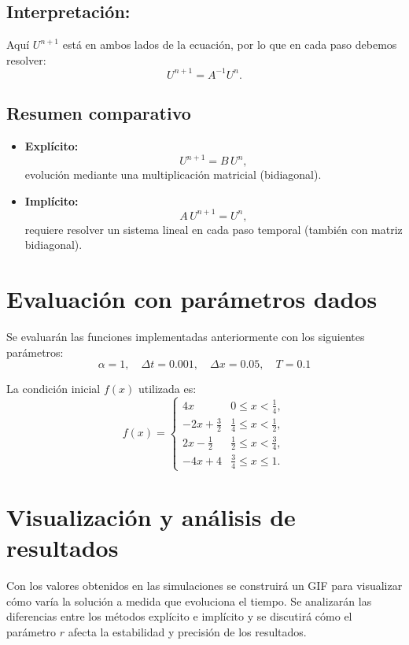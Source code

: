 \documentclass[12pt,a4paper]{article}
\begin{document}
\subsection*{Interpretación:}
Aquí $U^{n+1}$ está en ambos lados de la ecuación, por lo que en cada paso debemos resolver:
\[
U^{n+1} = A^{-1} U^n.
\]

\subsection{Resumen comparativo}

\begin{itemize}
    \item \textbf{Explícito:}  
    \[
    U^{n+1} = B\,U^n,
    \]
    evolución mediante una multiplicación matricial (bidiagonal).

    \item \textbf{Implícito:}  
    \[
    A\,U^{n+1} = U^n,
    \]
    requiere resolver un sistema lineal en cada paso temporal (también con matriz bidiagonal).
\end{itemize}

\section{Evaluación con parámetros dados}

Se evaluarán las funciones implementadas anteriormente con los siguientes parámetros:
\[
\alpha = 1, \quad \Delta t = 0.001, \quad \Delta x = 0.05, \quad T = 0.1
\]

La condición inicial $f(x)$ utilizada es:
\[
f(x) =
\begin{cases}
4x & 0 \leq x < \tfrac{1}{4}, \\
-2x + \tfrac{3}{2} & \tfrac{1}{4} \leq x < \tfrac{1}{2}, \\
2x - \tfrac{1}{2} & \tfrac{1}{2} \leq x < \tfrac{3}{4}, \\
-4x + 4 & \tfrac{3}{4} \leq x \leq 1.
\end{cases}
\]


\section{Visualización y análisis de resultados}

Con los valores obtenidos en las simulaciones se construirá un GIF para visualizar
cómo varía la solución a medida que evoluciona el tiempo. Se analizarán las diferencias entre los métodos explícito e implícito y se discutirá cómo el parámetro $r$ afecta la estabilidad y precisión de los resultados.
\end{document}
